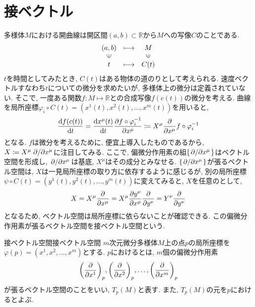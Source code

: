 \documentclass[../main.tex]{subfiles}
\begin{document}
\section{接ベクトル}
    多様体$M$における開曲線は開区間$(a,b)\subset\mathbb{R}$から$M$への写像$C$のことである.
    \begin{equation}
        \begin{array}{ccc}
            (a,b)  & \longmapsto & M \\
            \rotatebox{90}{$\in$} & & \rotatebox{90}{$\in$} \\
            t & \longmapsto & C(t)
        \end{array}
    \end{equation}
    $t$を時間としてみたとき, $C(t)$はある物体の道のりとして考えられる.  速度ベクトルすなわち$t$についての微分を求めたいが, 多様体上の微分は定義されていない. そこで, 一度ある関数$f:M \mapsto \mathbb{R}$との合成写像$f(c(t))$の微分を考える. 曲線を局所座標$\varphi_i \circ C(t)=(x^1(t),x^2(t),\ldots,x^m(t))$を用いると,
    \begin{equation}
        \dv{f(c(t))}{t} = \dv{x^\mu(t)}{t}\pdv{f\circ\varphi_i^{-1}}{x^\mu}
                        \coloneqq X^\mu\pdv{x^\mu}f\circ\varphi_i^{-1}
    \end{equation}
    となる. $f$は微分を考えるために, 便宜上導入したものであるから, $X\coloneqq X^\mu \pdv*{x^\mu}$に注目してみる. ここで, 偏微分作用素の組$\{\pdv*{x^\mu}\}$はベクトル空間を形成し, $\pdv*{x^\mu}$は基底, $X^\mu$はその成分とみなせる. $\{\pdv*{x^\mu}\}$が張るベクトル空間は,  $X$は一見局所座標の取り方に依存するように感じるが, 別の局所座標$\psi \circ C(t)=(y^1(t),y^2(t),\ldots,y^m(t))$に変えてみると,  $X$を任意のとして,
    \begin{equation}
        X = X^\mu\pdv{x^\mu}
          = X^\mu \pdv{y^\nu}{x^\mu}\pdv{y^\nu}
          = Y^\nu \pdv{y^\nu}
    \end{equation}
    となるため, ベクトル空間は局所座標に依らないことが確認できる. この偏微分作用素が張るベクトル空間を接ベクトル空間という.

    \begin{dfn}{接ベクトル空間}{接ベクトル空間}
        $m$次元微分多様体$M$上の点$p$の局所座標を$\varphi(p)=(x^1,x^2,\ldots,x^m)$とする. $p$におけるとは,
        $m$個の偏微分作用素
        \begin{equation}
            \qty(\pdv{x^1})_p, \qty(\pdv{x^2})_p, \ldots, \qty(\pdv{x^m})_p
        \end{equation}
        が張るベクトル空間のことをいい, $T_p(M)$と表す. また, $T_p(M)$の元を$p$におけるとよぶ.
    \end{dfn}
\end{document}
